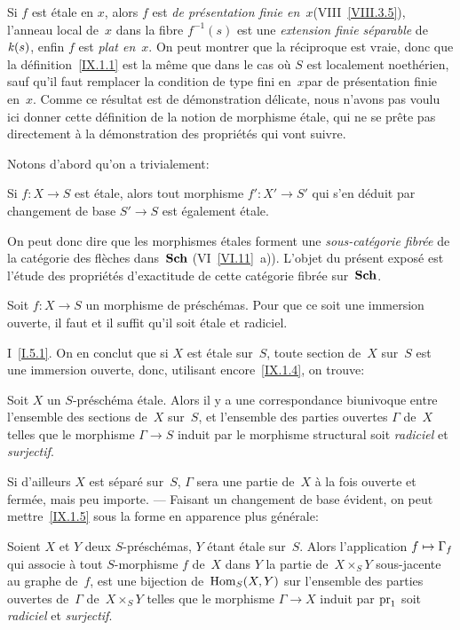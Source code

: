 \begin{remarques}
\label{IX.1.2}
Si $f$ est \'etale en $x$, alors $f$ est \og \emph{de présentation
finie en}~$x$\fg (VIII~\ref{VIII.3.5}), l'anneau local de~$x$ dans la
fibre $f^{-1}(s)$ est une \emph{extension finie séparable} de
$\mathit{k}(s)$, enfin $f$ est \emph{plat en}~$x$. On peut montrer que la
r\'eciproque est vraie, donc que la d\'efinition~\ref{IX.1.1} est
la m\^eme que dans le cas o\`u $S$ est localement noeth\'erien,
sauf qu'il faut remplacer la condition \og de type fini en~$x$\fg par
\og de pr\'esentation finie en~$x$\fg. Comme ce r\'esultat est de
d\'emonstration d\'elicate, nous n'avons pas voulu ici donner
cette d\'efinition de la notion de morphisme \'etale, qui ne se
pr\^ete pas directement \`a la d\'emonstration des
propri\'et\'es qui vont suivre.
\end{remarques}

Notons d'abord qu'on a trivialement:
\begin{proposition}
\label{IX.1.3}
Si $f\colon X\to S$ est \'etale, alors tout morphisme $f'\colon
X'\to S'$ qui s'en d\'eduit par changement de base $S'\to S$ est
\'egalement \'etale.
\end{proposition}

On peut donc dire que les morphismes \'etales forment une
\emph{sous-catégorie fibrée} de la cat\'egorie des
fl\`eches dans~$\mathbf{Sch}$
(\cf VI~\ref{VI.11}~a)). L'objet du pr\'esent
expos\'e est l'\'etude des propri\'et\'es d'exactitude de
cette cat\'egorie fibr\'ee sur~$\mathbf{Sch}$.
\begin{proposition}
\label{IX.1.4}
Soit $f\colon X\to S$ un morphisme de pr\'esch\'emas. Pour que ce
soit une immersion ouverte, il faut et il suffit qu'il soit \'etale
et radiciel.
\end{proposition}

\Cf I~\ref{I.5.1}. On en conclut que si $X$ est \'etale sur~$S$, toute section de~$X$ sur~$S$ est une immersion ouverte, donc,
utilisant encore~\ref{IX.1.4}, on trouve:
\begin{corollaire}
\label{IX.1.5}
Soit $X$ un $S$-pr\'esch\'ema \'etale. Alors il y a une
correspondance biunivoque entre l'ensemble des sections de~$X$
sur~$S$, et l'ensemble des parties
ouvertes $\Gamma$ de~$X$ telles que le morphisme $\Gamma \to S$ induit
par le morphisme structural soit \emph{radiciel} et \emph{surjectif}.
\end{corollaire}

Si d'ailleurs $X$ est s\'epar\'e sur~$S$, $\Gamma$ sera une partie
de~$X$ \`a la fois ouverte et ferm\'ee, mais peu importe. --- Faisant un changement de base \'evident, on peut mettre~\ref{IX.1.5}
sous la forme en apparence plus g\'en\'erale:
\begin{corollaire}
\label{IX.1.6}
Soient $X$ et $Y$ deux $S$-pr\'esch\'emas, $Y$ \'etant \'etale
sur~$S$. Alors l'application $f \mto \Gamma_f$ qui associe \`a
tout $S$-morphisme $f$ de~$X$ dans $Y$ la partie de~$X\times_S Y$
sous-jacente au graphe de~$f$, est une bijection de~$\operatorname{Hom}_S(X,Y)$ sur
l'ensemble des parties ouvertes de~$\Gamma$ de~$X\times_S Y$ telles
que le morphisme $\Gamma\to X$ induit par $\mathrm{pr}_1$ soit
\emph{radiciel} et \emph{surjectif}.
\end{corollaire}

